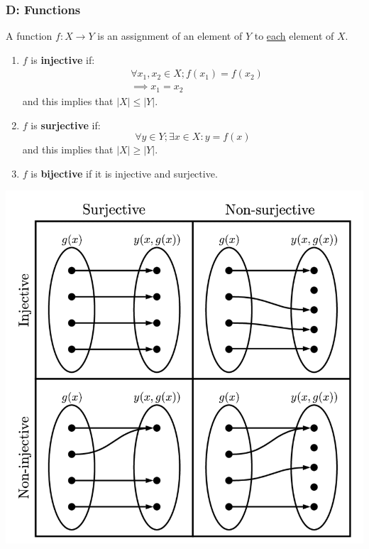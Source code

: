 \documentclass{article}
\begin{document}
\begin{multicols*}{3}
\noindent

\subsubsection*{D: Functions}
A function $f:X\rightarrow Y$ is an assignment
of an element of $Y$ to \underline{each} element of $X$.
\begin{enumerate}
    \item $f$ is \textbf{injective} if:
    \begin{align*}
        &\forall x_1,x_2\in X;
        f(x_1)=f(x_2) \\ &\implies x_1=x_2
    \end{align*}
    and this implies that $|X|\leq|Y|$.

    \item $f$ is \textbf{surjective} if:
    $$\forall y\in Y;\exists x\in X: y=f(x)$$
    and this implies that $|X|\geq|Y|$.

    \item $f$ is \textbf{bijective}
    if it is injective and surjective.
\end{enumerate}
\begin{center}
    \includegraphics[scale=0.2]{f00.png}
\end{center}


\end{multicols*}
\end{document}
